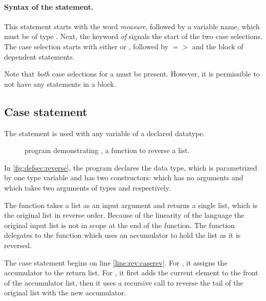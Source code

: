 \paragraph{Syntax of the  statement.} This statement
starts with the word \emph{measure}, 
followed by a variable name, which must be of type . 
Next, the keyword \emph{of} signals the start of the two case selections.
 The case selection starts with either  or , followed by
$=>$ and the block of dependent statements.

Note that \emph{both} case selections for a \qbit{} must be present. However,
it is permissible to not have any statements in a block.

\subsection{Case statement}\label{subsec:casestatements}
The  statement is used with any variable of a declared
datatype. 
\begin{figure}[htbp]
\begin{singlespace}

\end{singlespace}
\caption[Reverse program to demonstrate ]{\lqpl{} program demonstrating , a function to reverse a list.}
\label{fig:defsec:reverse}
\end{figure}  


In \vref{fig:defsec:reverse}, the program declares the
  data type, which is parametrized by one
type variable and has two constructors:  which has no
arguments and  which takes two arguments of types
 and  respectively.

The function  takes a list 
as an input argument and returns a single list, which is the original 
list in reverse order. Because of the linearity of the language
the original input list is not in scope at the end of the function.
The function  delegates to the function 
which uses an accumulator to hold the list as it is reversed.

The case statement begins on line \ref{line:rev:caserev}. For
, it assigns the accumulator to the return list. For
, it first adds the current element to the
front of the accumulator list, then it uses a recursive call
to reverse the tail of the original list with the new accumulator.



